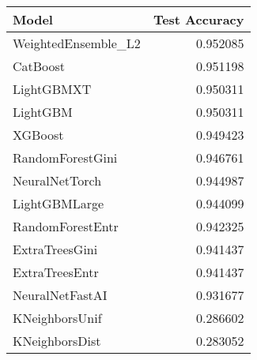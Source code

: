 \begin{tabular}{lr}
\toprule
Model & Test Accuracy \\
\midrule
WeightedEnsemble_L2 & 0.952085 \\
CatBoost & 0.951198 \\
LightGBMXT & 0.950311 \\
LightGBM & 0.950311 \\
XGBoost & 0.949423 \\
RandomForestGini & 0.946761 \\
NeuralNetTorch & 0.944987 \\
LightGBMLarge & 0.944099 \\
RandomForestEntr & 0.942325 \\
ExtraTreesGini & 0.941437 \\
ExtraTreesEntr & 0.941437 \\
NeuralNetFastAI & 0.931677 \\
KNeighborsUnif & 0.286602 \\
KNeighborsDist & 0.283052 \\
\bottomrule
\end{tabular}
